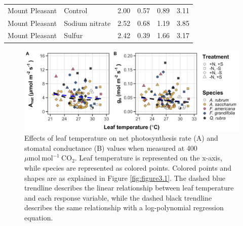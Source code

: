 \begin{landscape}
\begin{table}[]
\begin{tabular}{p{3cm}p{3.5cm}p{1.5cm}p{1.5cm}p{2.75cm}p{2.75cm}}
        Mount Pleasant & Control          & \multicolumn{1}{r}{2.00}    & \multicolumn{1}{r}{0.57}  & \multicolumn{1}{r}{0.89}          & \multicolumn{1}{r}{3.11}   \\
        Mount Pleasant & Sodium nitrate   & \multicolumn{1}{r}{2.52}    & \multicolumn{1}{r}{0.68}  & \multicolumn{1}{r}{1.19}          & \multicolumn{1}{r}{3.85}   \\
        Mount Pleasant & Sulfur           & \multicolumn{1}{r}{2.42}    & \multicolumn{1}{r}{0.39}  & \multicolumn{1}{r}{1.66}          & \multicolumn{1}{r}{3.17} \\
        \hline        
    \end{tabular}%
    \end{table}
\end{landscape}
\clearpage

\newpage
\begin{landscape}
    \begin{figure}
        \centering
        \includegraphics[width=\linewidth]{ch3_NxpH/figs/NxS_figS1_leaftemp.png}
        \caption[Effects of leaf temperature on net photosynthesis rate and stomatal conductance values when measured at 400 $\mu \mathrm{mol\ mol^{-1}\ CO_2}$]{Effects of leaf temperature on net photosynthesis rate (A) and stomatal conductance (B) values when measured at 400 $\mu \mathrm{mol\ mol^{-1}\ CO_2}$. Leaf temperature is represented on the x-axis, while species are represented as colored points. Colored points and shapes are as explained in Figure \ref{fig:figure3.1}. The dashed blue trendline describes the linear relationship between leaf temperature and each response variable, while the dashed black trendline describes the same relationship with a log-polynomial regression equation.}
        \label{fig:figure.b1}
    \end{figure}
\end{landscape}
\clearpage
